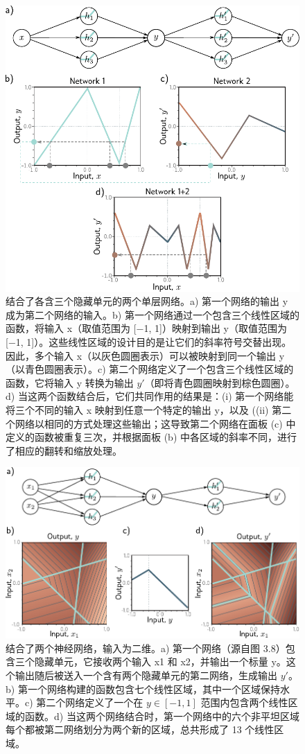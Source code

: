 \documentclass[lang=cn,newtx,10pt,scheme=chinese]{elegantbook}
\begin{document}
\begin{figure}[ht!]
	\centering
	\includegraphics[width=0.7\linewidth]{PDFFigures/UDLChap4PDF/DeepConcat.pdf}
	\caption{结合了各含三个隐藏单元的两个单层网络。a) 第一个网络的输出 y 成为第二个网络的输入。b) 第一个网络通过一个包含三个线性区域的函数，将输入 x（取值范围为 [−1, 1]）映射到输出 y（取值范围为 [−1, 1]）。这些线性区域的设计目的是让它们的斜率符号交替出现。因此，多个输入 x（以灰色圆圈表示）可以被映射到同一个输出 y（以青色圆圈表示）。c) 第二个网络定义了一个包含三个线性区域的函数，它将输入 y 转换为输出 \(y \prime\)（即将青色圆圈映射到棕色圆圈）。d) 当这两个函数结合后，它们共同作用的结果是：(i) 第一个网络能将三个不同的输入 x 映射到任意一个特定的输出 y，以及 ((ii) 第二个网络以相同的方式处理这些输出；这导致第二个网络在面板 (c) 中定义的函数被重复三次，并根据面板 (b) 中各区域的斜率不同，进行了相应的翻转和缩放处理。}
\end{figure}

\begin{figure}[ht!]
	\centering
	\includegraphics[width=0.7\linewidth]{PDFFigures/UDLChap4PDF/DeepTwoLayer2D.pdf}
	\caption{结合了两个神经网络，输入为二维。a) 第一个网络（源自图 3.8）包含三个隐藏单元，它接收两个输入 x1 和 x2，并输出一个标量 y。这个输出随后被送入一个含有两个隐藏单元的第二网络，生成输出 \(y \prime\)。b) 第一个网络构建的函数包含七个线性区域，其中一个区域保持水平。c) 第二个网络定义了一个在 \(y \in [−1, 1]\) 范围内包含两个线性区域的函数。d) 当这两个网络结合时，第一个网络中的六个非平坦区域每个都被第二网络划分为两个新的区域，总共形成了 13 个线性区域。}
\end{figure}
\end{document}
